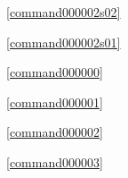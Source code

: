 ﻿



\noindent\commandnumbernameone\ \ref{command000002s02}\dotfill\pageref{command000002s02}%

\noindent\commandnumbernameone\ \ref{command000002s01}\dotfill\pageref{command000002s01}%

\noindent\commandnumbernameone\ \ref{command000000}\dotfill\pageref{command000000}%

\noindent\commandnumbernameone\ \ref{command000001}\dotfill\pageref{command000001}%

\noindent\commandnumbernameone\ \ref{command000002}\dotfill\pageref{command000002}%

\noindent\commandnumbernameone\ \ref{command000003}\dotfill\pageref{command000003}%






